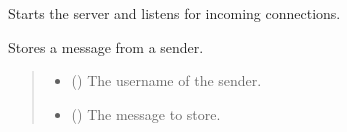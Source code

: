 \documentclass[letterpaper,10pt,english]{sphinxmanual}
\begin{document}
\begin{fulllineitems}
\begin{fulllineitems}
\label{\detokenize{server1:server1.Server.start}}
\pysigstartsignatures
{}
\pysigstopsignatures
\sphinxAtStartPar
Starts the server and listens for incoming connections.

\end{fulllineitems}


\begin{fulllineitems}
\label{\detokenize{server1:server1.Server.store_message}}
\pysigstartsignatures
{}
\pysigstopsignatures
\sphinxAtStartPar
Stores a message from a sender.
\begin{quote}\begin{description}
\begin{itemize}
\item {} 
\sphinxAtStartPar
{} () \textendash{} The username of the sender.

\item {} 
\sphinxAtStartPar
{} () \textendash{} The message to store.

\end{itemize}

\end{description}\end{quote}

\end{fulllineitems}


\end{fulllineitems}

\end{document}
